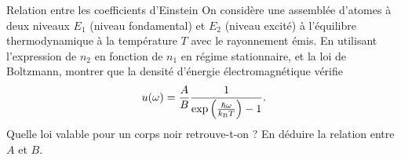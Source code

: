 \documentclass[12pt,fancy]{cours}
\begin{document}
\begin{exemple}{Relation entre les coefficients d’Einstein}
  On considère une assemblée d’atomes à deux niveaux $E_1$ (niveau fondamental) et $E_2$ (niveau excité) à l’équilibre thermodynamique à la température $T$ avec le rayonnement émis.
    En utilisant l’expression de $n_2$ en fonction de $n_1$ en régime stationnaire, et la loi de Boltzmann, montrer que la densité d’énergie électromagnétique vérifie 
    \begin{equation}
      u(\omega) = \frac{A}{B} \frac{1}{\exp\left( \frac{\hbar\omega}{k_{\rm{B}}T}\right)-1}.
    \end{equation}
   Quelle loi valable pour un corps noir retrouve-t-on ? En déduire la relation entre $A$ et $B$.
\end{exemple}
\end{document}
